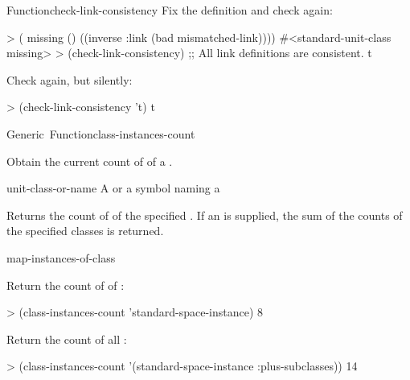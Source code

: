 \documentclass[10pt,twoside,english,pdftex]{article}
\begin{document}
\begin{functiondoc}{Function}{check-link-consistency}{
     \returns{} }
Fix the definition and check again:
\begin{example}
> ( missing () ((inverse :link (bad mismatched-link))))
#<standard-unit-class missing>
> (check-link-consistency)
;; All link definitions are consistent.
t
\end{example}

Check again, but silently:
\begin{example}
> (check-link-consistency 't)
t
\end{example}

\end{functiondoc}


\begin{functiondoc}{Generic~Function}{class-instances-count}%
{ \returns{} }
%
%

\fnsyntax

\fnpurpose Obtain the current count of  of a
. 

\fnmethods
{}%
  {\code{(} 
  \returns{} } 
%
  {\code{(} 
  \returns{} } 
%
  {\code{(} 
  \returns{} }

\fnpackage {}

\fnmodule {}

\fnargs
\begin{args}{unit-class-or-name}
 A  or a symbol naming a
\end{args}

\fnreturns Returns the count of  of the
specified .  If an
 is supplied, the sum of the
 counts of the specified classes is returned.

\begin{alsos}{map-instances-of-class}
\end{alsos}

\fnexamples
 Return the count of  of
: 
\begin{example}
> (class-instances-count 'standard-space-instance)
8
\end{example} 

Return the count of all :
\begin{example}
> (class-instances-count '(standard-space-instance :plus-subclasses))
14
\end{example} 

\end{functiondoc}
\end{document}

